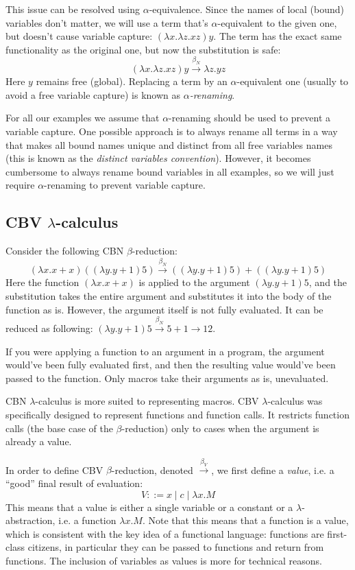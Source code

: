 \documentclass{article}
\newcommand{\lam}{\lambda}
\newcommand{\cbnb}{\overset{\beta_{N}}{\rightarrow}}
\newcommand{\cbvb}{\overset{\beta_{V}}{\rightarrow}}
\begin{document}
This issue can be resolved using $\alpha$-equivalence. Since the names of local (bound) variables don't matter, we will use a term that's $\alpha$-equivalent to the given one, but doesn't cause variable capture: $(\lam x. \lam z.  x z) y$. The term has the exact same functionality as the original one, but now the substitution is safe:
$$
(\lam x. \lam z.  x z) y \cbnb \lam z. y z
$$
Here $y$ remains free (global). Replacing a term by an $\alpha$-equivalent one (usually to avoid a free variable capture) is known as \textit{$\alpha$-renaming}.      

For all our examples we assume that $\alpha$-renaming should be used to prevent a variable capture. One possible approach is to always rename all terms in a way that makes all bound names unique and distinct from all free variables names (this is known as the \textit{distinct variables convention}). However, it becomes cumbersome to always rename bound variables in all examples, so we will just require $\alpha$-renaming to prevent variable capture.                                          

\subsection{CBV $\lam$-calculus}\label{cbv}
Consider the following CBN $\beta$-reduction: 
$$(\lam x. x + x)((\lam y. y + 1) 5) \cbnb ((\lam y. y + 1) 5) + ((\lam y. y + 1) 5)$$
Here the function $(\lam x. x + x)$ is applied to the argument $(\lam y. y + 1) 5$, and the substitution takes the entire argument and substitutes it into the body of the function as is. However, the argument itself is not fully evaluated. It can be reduced as following: $(\lam y. y + 1) 5 \cbnb 5 + 1 \rightarrow 12$. 

If you were applying a function to an argument in a program, the argument would've been fully evaluated first, and then the resulting value would've been passed to the function.  Only macros take their arguments as is, unevaluated. 

CBN $\lam$-calculus is more suited to representing macros. CBV $\lam$-calculus was specifically designed to represent functions and function calls. It restricts function calls (the base case of the $\beta$-reduction) only to cases when the argument is already a value. 

In order to define CBV $\beta$-reduction, denoted $\cbvb$, we first define a \textit{value}, i.e. a ``good'' final result of evaluation:
$$
V ::= x \mid c \mid \lam x. M
$$
This means that a value is either a single variable or a constant or a $\lam$-abstraction, i.e. a function $\lam x. M$. Note that this means that a function is a value, which is consistent with the key idea of a functional language: functions are first-class citizens, in particular they can be passed to functions and return from functions. The inclusion of variables as values is more for technical reasons. 
\end{document}
